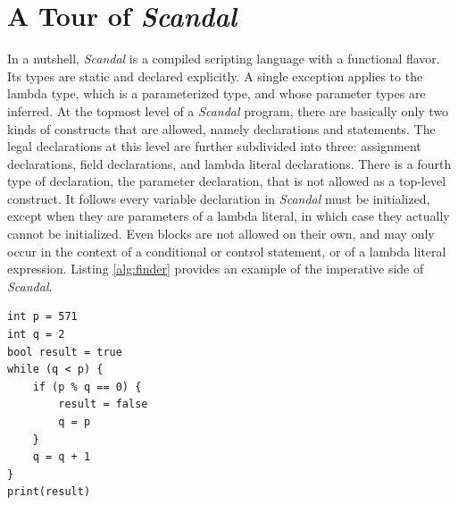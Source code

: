 \section{A Tour of \emph{Scandal}}

In a nutshell, \emph{Scandal} is a compiled scripting language with a functional flavor. Its types are static and declared explicitly. A single exception applies to the lambda type, which is a parameterized type, and whose parameter types are inferred. At the topmost level of a \emph{Scandal} program, there are basically only two kinds of constructs that are allowed, namely declarations and statements. The legal declarations at this level are further subdivided into three: assignment declarations, field declarations, and lambda literal declarations. There is a fourth type of declaration, the parameter declaration, that is not allowed as a top-level construct. It follows every variable declaration in \emph{Scandal} must be initialized, except when they are parameters of a lambda literal, in which case they actually cannot be initialized. Even blocks are not allowed on their own, and may only occur in the context of a conditional or control statement, or of a lambda literal expression. Listing \ref{alg:finder} provides an example of the imperative side of \emph{Scandal}.

\begin{lstlisting}[emph={int,bool,while,if,true,false,print},emphstyle={\textbf},caption={A naive algorithm to determine whether an integer is prime.},label={alg:finder}]
int p = 571
int q = 2
bool result = true
while (q < p) {
	if (p % q == 0) {
		result = false
		q = p
	}
	q = q + 1
}
print(result)
\end{lstlisting}

